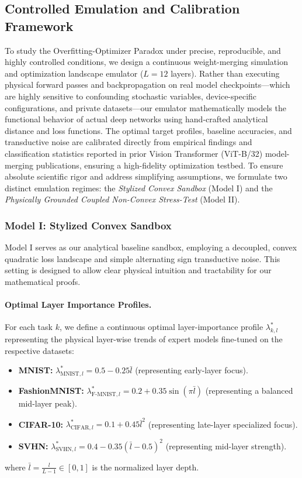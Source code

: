 \subsection{Controlled Emulation and Calibration Framework}
To study the Overfitting-Optimizer Paradox under precise, reproducible, and highly controlled conditions, we design a continuous weight-merging simulation and optimization landscape emulator ($L=12$ layers). Rather than executing physical forward passes and backpropagation on real model checkpoints---which are highly sensitive to confounding stochastic variables, device-specific configurations, and private datasets---our emulator mathematically models the functional behavior of actual deep networks using hand-crafted analytical distance and loss functions. The optimal target profiles, baseline accuracies, and transductive noise are calibrated directly from empirical findings and classification statistics reported in prior Vision Transformer (ViT-B/32) model-merging publications, ensuring a high-fidelity optimization testbed. To ensure absolute scientific rigor and address simplifying assumptions, we formulate two distinct emulation regimes: the \emph{Stylized Convex Sandbox} (Model I) and the \emph{Physically Grounded Coupled Non-Convex Stress-Test} (Model II).

\subsubsection{Model I: Stylized Convex Sandbox}
Model I serves as our analytical baseline sandbox, employing a decoupled, convex quadratic loss landscape and simple alternating sign transductive noise. This setting is designed to allow clear physical intuition and tractability for our mathematical proofs.

\paragraph{Optimal Layer Importance Profiles.} For each task $k$, we define a continuous optimal layer-importance profile $\lambda^*_{k, l}$ representing the physical layer-wise trends of expert models fine-tuned on the respective datasets:
\begin{itemize}
    \item \textbf{MNIST:} $\lambda^*_{\text{MNIST}, l} = 0.5 - 0.25 \bar{l}$ (representing early-layer focus).
    \item \textbf{FashionMNIST:} $\lambda^*_{\text{F-MNIST}, l} = 0.2 + 0.35 \sin(\pi \bar{l})$ (representing a balanced mid-layer peak).
    \item \textbf{CIFAR-10:} $\lambda^*_{\text{CIFAR}, l} = 0.1 + 0.45 \bar{l}^2$ (representing late-layer specialized focus).
    \item \textbf{SVHN:} $\lambda^*_{\text{SVHN}, l} = 0.4 - 0.35 (\bar{l} - 0.5)^2$ (representing mid-layer strength).
\end{itemize}
where $\bar{l} = \frac{l}{L-1} \in [0, 1]$ is the normalized layer depth.

